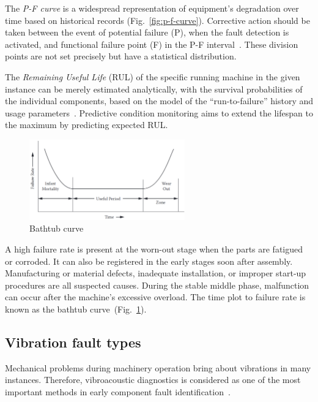 The \emph{P-F curve} is a widespread representation of equipment's degradation over time based on historical records (Fig.~\ref{fig:p-f-curve}). Corrective action should be taken between the event of potential failure (P), when the fault detection is activated, and functional failure point (F) in the P-F interval~\cite{bousdekis_enterprise_2021}. These division points are not set precisely but have a statistical distribution.

The \emph{Remaining Useful Life} (RUL) of the specific running machine in the given instance can be merely estimated analytically, with the survival probabilities of the individual components, based on the model of the ``run-to-failure'' history and usage parameters~\cite{okoh_overview_2014}. Predictive condition monitoring aims to extend the lifespan to the maximum by predicting expected RUL.

\begin{figure}[ht]
	\centering
	\includegraphics[width=0.6\textwidth]{assets/analysis/bath-tub-curve.png}
	\caption{Bathtub curve~\cite{mohanty_machinery_2015}}
	\label{fig:bathtub-curve}
\end{figure}

A high failure rate is present at the worn-out stage when the parts are fatigued or corroded. It can also be registered in the early stages soon after assembly. Manufacturing or material defects, inadequate installation, or improper start-up procedures are all suspected causes. During the stable middle phase, malfunction can occur after the machine's excessive overload. The time plot to failure rate is known as the bathtub curve~(Fig.~\ref{fig:bathtub-curve}).

\subsection{Vibration fault types}
Mechanical problems during machinery operation bring about vibrations in many instances. Therefore, vibroacoustic diagnostics is considered as one of the most important methods in early component fault identification~\cite{ziaran_technicka_2013}.

